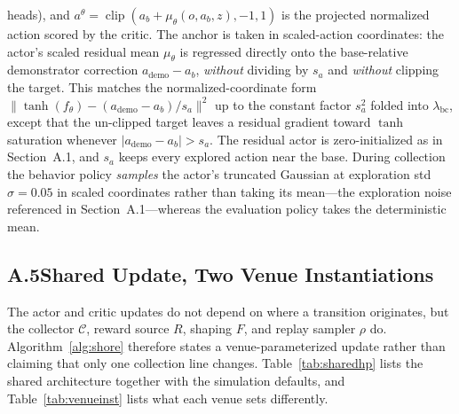 \documentclass[letterpaper]{article} %
\begin{document}
heads), and $a^\theta=\operatorname{clip}(a_b+\mu_\theta(o,a_b,z),-1,1)$ is the
projected normalized action scored by the critic. The anchor is taken in scaled-action coordinates: the actor's
scaled residual mean $\mu_\theta$ is regressed directly onto the base-relative
demonstrator correction $a_{\mathrm{demo}}-a_b$, \emph{without} dividing by $s_a$ and
\emph{without} clipping the target. This matches the normalized-coordinate form
$\lVert\tanh(f_\theta)-(a_{\mathrm{demo}}-a_b)/s_a\rVert^2$ up to the constant factor
$s_a^2$ folded into $\lambda_{\mathrm{bc}}$, except that the un-clipped target leaves a
residual gradient toward $\tanh$ saturation whenever
$\lvert a_{\mathrm{demo}}-a_b\rvert>s_a$. The residual actor is zero-initialized as in
Section~A.1, and $s_a$ keeps every explored action near the base. During collection the
behavior policy \emph{samples} the actor's truncated Gaussian at exploration std
$\sigma=0.05$ in scaled coordinates rather than taking its mean---the exploration noise
referenced in Section~A.1---whereas the evaluation policy takes the deterministic mean.

\subsection{A.5\quad Shared Update, Two Venue Instantiations}

The actor and critic updates do not depend on where a transition originates, but the
collector $\mathcal C$, reward source $R$, shaping $F$, and replay sampler $\rho$ do.
Algorithm~\ref{alg:shore} therefore states a venue-parameterized update rather than
claiming that only one collection line changes. Table~\ref{tab:sharedhp} lists
the shared architecture together with the simulation defaults, and
Table~\ref{tab:venueinst} lists what each venue sets differently.
\end{document}
